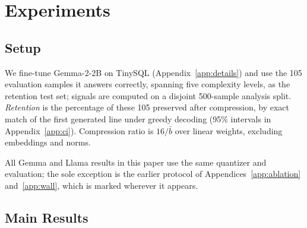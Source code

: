 \documentclass[11pt]{article}
\begin{document}
\section{Experiments}
\subsection{Setup}

\label{sec:setup}
We fine-tune Gemma-2-2B \cite{gemmateam2024gemma2improvingopen} 
on TinySQL \cite{harrasse2025tinysqlprogressivetexttosqldataset} 
(Appendix~\ref{app:details}) and use the 105 evaluation samples 
it answers correctly, spanning five complexity levels, as the 
retention test set; signals are computed on a disjoint 500-sample 
analysis split. \emph{Retention} is the percentage of these 105 
preserved after compression, by exact match of the first 
generated line under greedy decoding (95\% intervals in 
Appendix~\ref{app:ci}). Compression ratio is $16/\bar{b}$ over 
linear weights, excluding embeddings and norms.

All Gemma and Llama results in this paper use the same 
quantizer and evaluation; the sole exception is the earlier 
protocol of Appendices~\ref{app:ablation} 
and~\ref{app:wall}, which is marked wherever it appears.

\subsection{Main Results}
\label{sec:main}
\end{document}
